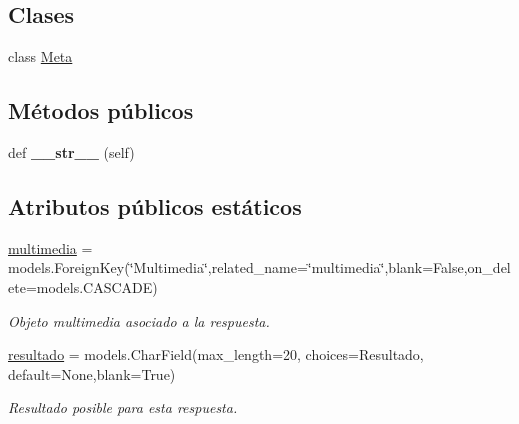 \subsection*{Clases}
\begin{DoxyCompactItemize}
\item 
class \hyperlink{classappEmotionIOT_1_1models_1_1Respuesta_1_1Meta}{Meta}
\end{DoxyCompactItemize}
\subsection*{Métodos públicos}
\begin{DoxyCompactItemize}
\item 
def {\bfseries \+\_\+\+\_\+str\+\_\+\+\_\+} (self)\hypertarget{classappEmotionIOT_1_1models_1_1Respuesta_a5d7f6165d2310d90b1cd6785df452399}{}\label{classappEmotionIOT_1_1models_1_1Respuesta_a5d7f6165d2310d90b1cd6785df452399}

\end{DoxyCompactItemize}
\subsection*{Atributos públicos estáticos}
\begin{DoxyCompactItemize}
\item 
\hyperlink{classappEmotionIOT_1_1models_1_1Respuesta_a06443d6bc32905f24598f37ec1e350ce}{multimedia} = models.\+Foreign\+Key(\char`\"{}Multimedia\char`\"{},related\+\_\+name=\char`\"{}multimedia\char`\"{},blank=False,on\+\_\+delete=models.\+C\+A\+S\+C\+A\+DE)\hypertarget{classappEmotionIOT_1_1models_1_1Respuesta_a06443d6bc32905f24598f37ec1e350ce}{}\label{classappEmotionIOT_1_1models_1_1Respuesta_a06443d6bc32905f24598f37ec1e350ce}

\begin{DoxyCompactList}\small\item\em Objeto multimedia asociado a la respuesta. \end{DoxyCompactList}\item 
\hyperlink{classappEmotionIOT_1_1models_1_1Respuesta_a47486f9a000a4bf11a3646b2a7a7e456}{resultado} = models.\+Char\+Field(max\+\_\+length=20, choices=Resultado, default=None,blank=True)\hypertarget{classappEmotionIOT_1_1models_1_1Respuesta_a47486f9a000a4bf11a3646b2a7a7e456}{}\label{classappEmotionIOT_1_1models_1_1Respuesta_a47486f9a000a4bf11a3646b2a7a7e456}

\begin{DoxyCompactList}\small\item\em Resultado posible para esta respuesta. \end{DoxyCompactList}\end{DoxyCompactItemize}


